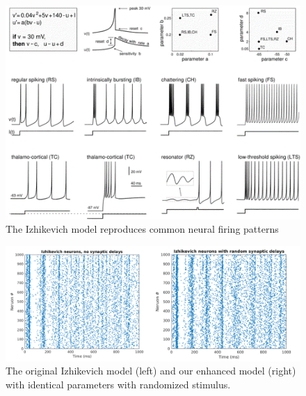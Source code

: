 \documentclass[a4paper,11pt]{article}
\begin{document}
\begin{figure}[p]
 \caption{The Izhikevich model reproduces common neural firing patterns \cite{izhikevich2003}}
 \label{fig:izzy_model}
 \centering
   \includegraphics[width=\textwidth]{fig/izzy_model}
\end{figure}

\begin{figure}[p]
 \caption{The original Izhikevich model (left) and our enhanced model (right) with identical parameters with randomized stimulus.}
 \label{fig:izzy_enhanced}
 \centering
   \includegraphics[width=\textwidth]{fig/izzy_enhanced}
\end{figure}
\end{document}
